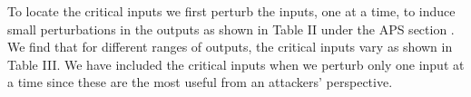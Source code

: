 To locate the critical inputs we first perturb the inputs, one at a time, to induce small perturbations in the outputs as shown in Table II under the APS section . We find that for different ranges of outputs, the critical inputs vary as shown in Table III. We have included the critical inputs when we perturb only one input at a time since these are the most useful from an attackers' perspective. 












